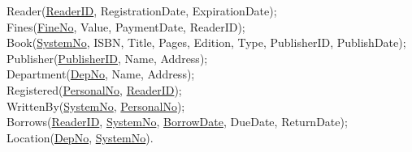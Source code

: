 \documentclass[11pt,a4paper]{article}
\begin{document}
Reader(\underline{ReaderID}, RegistrationDate, ExpirationDate);\\
Fines(\underline{FineNo}, Value, PaymentDate, ReaderID);\\
Book(\underline{SystemNo}, ISBN, Title, Pages, Edition, Type, PublisherID, PublishDate);\\
Publisher(\underline{PublisherID},  Name, Address);\\
Department(\underline{DepNo},  Name, Address);\\
Registered(\underline{PersonalNo}, \underline{ReaderID});\\
WrittenBy(\underline{SystemNo}, \underline{PersonalNo});\\
Borrows(\underline{ReaderID}, \underline{SystemNo}, \underline{BorrowDate}, DueDate, ReturnDate);\\
Location(\underline{DepNo}, \underline{SystemNo}).\\
\end{document}
